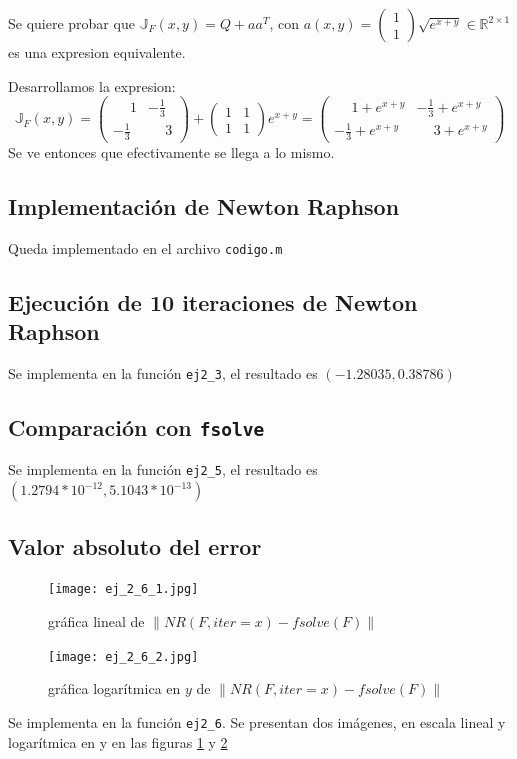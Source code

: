 \documentclass{endm}
\begin{document}
    Se quiere probar que $\mathbb{J}_F(x,y) = Q + aa^T$, con $a(x,y) = \begin{pmatrix} 1\\1 \end{pmatrix}\sqrt{e^{x+y}} \in \mathbb{R}^{2 \times 1}$
    es una expresion equivalente.
    
    Desarrollamos la expresion:
    \begin{equation}
        \mathbb{J}_F(x,y) = 
        \begin{pmatrix}
            \phantom{-}1 & -\frac{1}{3} \\
            -\frac{1}{3} & \phantom{-}3
        \end{pmatrix}
        +
        \begin{pmatrix} 1 & 1 \\ 1 & 1 \end{pmatrix} e^{x+y}
        =
        \begin{pmatrix}
            \phantom{-}1 + e^{x+y} & -\frac{1}{3} + e^{x+y} \\
            -\frac{1}{3} + e^{x+y} & \phantom{-}3 + e^{x+y}
        \end{pmatrix}
    \end{equation}
    Se ve entonces que efectivamente se llega a lo mismo.

\subsection{Implementación de Newton Raphson}
Queda implementado en el archivo \lstinline[style=mystyle]{codigo.m}

\subsection{Ejecución de 10 iteraciones de Newton Raphson}
Se implementa en la función \lstinline[style=mystyle]{ej2_3}, el resultado es $(-1.28035, 0.38786)$

\subsection{Comparación con \lstinline[style=mystyle]{fsolve}}
Se implementa en la función  \lstinline[style=mystyle]{ej2_5}, el resultado es $(1.2794*10^{-12},5.1043*10^{-13})$

\subsection{Valor absoluto del error}
\begin{figure}[htbp]
  \texttt{[image: ej\_2\_6\_1.jpg]}
  \caption{gráfica lineal de $\| NR(F,iter=x) - fsolve(F) \| $}
  \label{fig:2.6.1}
\end{figure}
\begin{figure}[htbp]
  \texttt{[image: ej\_2\_6\_2.jpg]}
  \caption{gráfica logarítmica en $y$ de $\| NR(F,iter=x) - fsolve(F) \| $}
  \label{fig:2.6.2}
\end{figure}
Se implementa en la función  \lstinline[style=mystyle]{ej2_6}. Se presentan dos imágenes, en escala lineal y logarítmica en y en las figuras \ref{fig:2.6.1} y \ref{fig:2.6.2}
\end{document}

